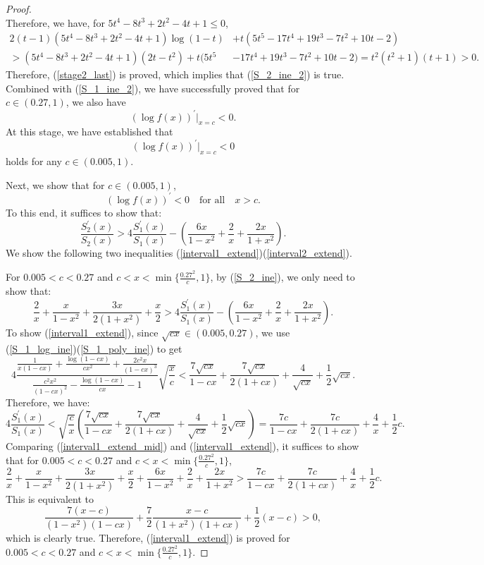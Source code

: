 ﻿\documentclass[10pt]{article}
\begin{document}
\begin{proof}
$$$$
Therefore, we have, for $5t^4 - 8t^3 + 2t^2 - 4t + 1\leq0$,
\begin{equation}
    \begin{aligned}
        2(t-1)(5t^4 - 8t^3 + 2t^2 - 4t + 1)\log(1-t)&+t(5t^5 - 17t^4 + 19t^3 - 7t^2 + 10t - 2)\\
        >(5t^4 - 8t^3 + 2t^2 - 4t + 1)(2t-t^2)+t(5t^5 &- 17t^4 + 19t^3 - 7t^2 + 10t - 2)=t^2(t^2+1)(t+1)>0.
    \end{aligned}
\end{equation}
Therefore, (\ref{stage2_last}) is proved, which implies that (\ref{S_2_ine_2}) is true. Combined with (\ref{S_1_ine_2}), we have successfully proved that for $c\in(0.27, 1)$, we also have
$$(\log f(x))^{'}\bigg|_{x=c}<0.$$
At this stage, we have established that
$$(\log f(x))^{'}\bigg|_{x=c}<0
$$
holds for any $c\in(0.005,1)$.

Next, we show that for $c\in(0.005,1)$, 
$$(\log f(x))^{'}<0\quad\text{for all}\quad x>c.
$$
To this end, it suffices to show that:
\begin{equation}
    \frac{S_2^{'}(x)}{S_2(x)}>4\frac{S_1^{'}(x)}{S_1(x)}-\left(\frac{6x}{1-x^2}+\frac{2}{x}+\frac{2x}{1+x^2}\right).
\end{equation}
We show the following two inequalities (\ref{interval1_extend})(\ref{interval2_extend}).

For $0.005<c<0.27$ and $c<x<\min\{\frac{0.27^2}{c},1\}$, by (\ref{S_2_ine}), we only need to show that:
\begin{equation}
    \frac{2}{x}+\frac{x}{1-x^2}+\frac{3x}{2(1+x^2)}+\frac{x}{2}>4\frac{S_1^{'}(x)}{S_1(x)}-\left(\frac{6x}{1-x^2}+\frac{2}{x}+\frac{2x}{1+x^2}\right). \label{interval1_extend}
\end{equation}
To show (\ref{interval1_extend}), since $\sqrt{cx}\in(0.005, 0.27)$, we use (\ref{S_1_log_ine})(\ref{S_1_poly_ine}) to get
\begin{equation}
    4\frac{\frac{1}{x(1-cx)}+\frac{\log(1-cx)}{cx^2}+\frac{2c^2x}{(1-cx)^3}}{\frac{c^2x^2}{(1-cx)^{2}}-\frac{\log(1-cx)}{cx}-1}\sqrt{\frac{x}{c}}<\frac{7\sqrt{cx}}{1-cx}+\frac{7\sqrt{cx}}{2(1+cx)}+\frac{4}{\sqrt{cx}}+\frac{1}{2}\sqrt{cx}.
\end{equation}
Therefore, we have:
\begin{equation}
    4\frac{S_1^{'}(x)}{S_1(x)}<\sqrt{\frac{c}{x}}\left(\frac{7\sqrt{cx}}{1-cx}+\frac{7\sqrt{cx}}{2(1+cx)}+\frac{4}{\sqrt{cx}}+\frac{1}{2}\sqrt{cx}\right) = \frac{7c}{1-cx}+\frac{7c}{2(1+cx)}+\frac{4}{x}+\frac{1}{2}c.
\label{interval1_extend_mid}
\end{equation}
Comparing (\ref{interval1_extend_mid}) and (\ref{interval1_extend}),
it suffices to show that for $0.005<c<0.27$ and $c<x<\min\{\frac{0.27^2}{c},1\}$,
$$\frac{2}{x}+\frac{x}{1-x^2}+\frac{3x}{2(1+x^2)}+\frac{x}{2}+\frac{6x}{1-x^2}+\frac{2}{x}+\frac{2x}{1+x^2}>\frac{7c}{1-cx}+\frac{7c}{2(1+cx)}+\frac{4}{x}+\frac{1}{2}c.
$$
This is equivalent to
$$\frac{7(x-c)}{(1-x^2)(1-cx)}+\frac{7}{2}\frac{x-c}{(1+x^2)(1+cx)}+\frac{1}{2}(x-c)>0,
$$
which is clearly true. Therefore, (\ref{interval1_extend}) is proved for $0.005<c<0.27$ and $c<x<\min\{\frac{0.27^2}{c},1\}$.


\end{proof}
\end{document}
